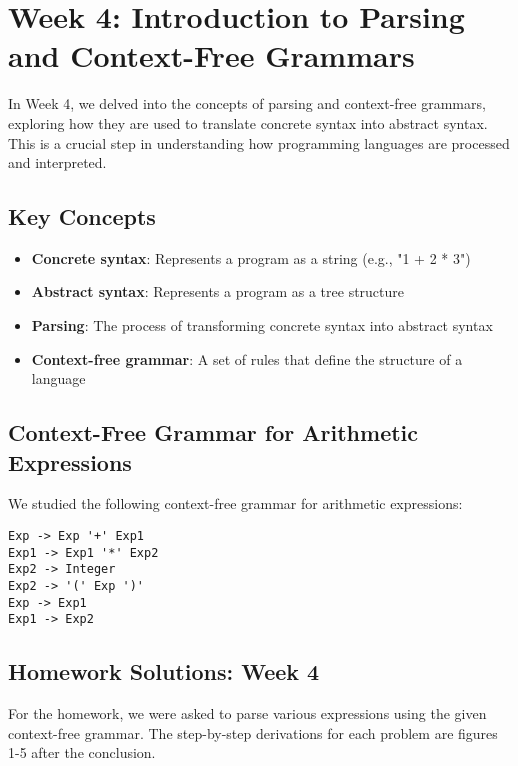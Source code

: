 \documentclass{article}
\begin{document}
\section{Week 4: Introduction to Parsing and Context-Free Grammars}
\label{sec:week4}

In Week 4, we delved into the concepts of parsing and context-free grammars, exploring how they are used to translate concrete syntax into abstract syntax. This is a crucial step in understanding how programming languages are processed and interpreted.

\subsection*{Key Concepts}

\begin{itemize}
    \item \textbf{Concrete syntax}: Represents a program as a string (e.g., "1 + 2 * 3")
    \item \textbf{Abstract syntax}: Represents a program as a tree structure
    \item \textbf{Parsing}: The process of transforming concrete syntax into abstract syntax
    \item \textbf{Context-free grammar}: A set of rules that define the structure of a language
\end{itemize}

\subsection*{Context-Free Grammar for Arithmetic Expressions}

We studied the following context-free grammar for arithmetic expressions:

\begin{verbatim}
Exp -> Exp '+' Exp1 
Exp1 -> Exp1 '*' Exp2              
Exp2 -> Integer            
Exp2 -> '(' Exp ')'  
Exp -> Exp1             
Exp1 -> Exp2
\end{verbatim}

\subsection*{Homework Solutions: Week 4}

For the homework, we were asked to parse various expressions using the given context-free grammar. The step-by-step derivations for each problem are figures 1-5 after the conclusion.
\end{document}
